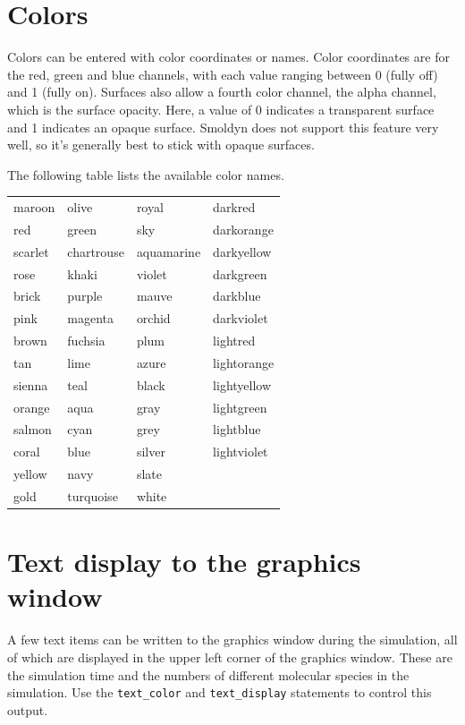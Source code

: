 \documentclass {scrbook}
\newcommand {\ttt} {\texttt}
\begin{document}
\section{Colors}

Colors can be entered with color coordinates or names. Color coordinates are for the red, green and blue channels, with each value ranging between 0 (fully off) and 1 (fully on). Surfaces also allow a fourth color channel, the alpha channel, which is the surface opacity. Here, a value of 0 indicates a transparent surface and 1 indicates an opaque surface. Smoldyn does not support this feature very well, so it's generally best to stick with opaque surfaces.

The following table lists the available color names.

\begin{longtable}[c]{llll}
maroon & olive & royal & darkred\\
red & green & sky & darkorange\\
scarlet & chartrouse & aquamarine & darkyellow\\
rose & khaki & violet & darkgreen\\
brick & purple & mauve & darkblue\\
pink & magenta & orchid & darkviolet\\
brown & fuchsia & plum & lightred\\
tan & lime & azure & lightorange\\
sienna & teal & black & lightyellow\\
orange & aqua & gray & lightgreen\\
salmon & cyan & grey & lightblue\\
coral & blue & silver & lightviolet\\
yellow & navy & slate\\
gold & turquoise & white\\
\end{longtable}

\section{Text display to the graphics window}

A few text items can be written to the graphics window during the simulation, all of which are displayed in the upper left corner of the graphics window. These are the simulation time and the numbers of different molecular species in the simulation. Use the \ttt{text\_color} and \ttt{text\_display} statements to control this output.
\end{document}

